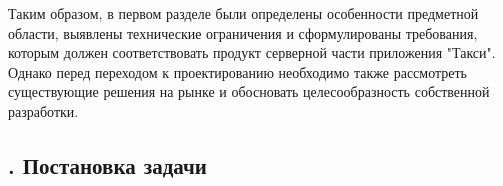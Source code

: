 {		\par \redline Таким образом, в первом разделе были определены особенности предметной области, выявлены технические ограничения и сформулированы требования, которым должен соответствовать продукт серверной части приложения "Такси"{}. Однако перед переходом к проектированию необходимо также рассмотреть существующие решения на рынке и обосновать целесообразность собственной разработки.
		
		\par
	}
	
	\subtitlespace
	
	\subsection*{
		\gostTitleFont
		\redline
		\thechaptercntr .\thesubchaptercntr \spc
		Постановка задачи
	} \addtocounter{subchaptercntr}{1}
	
	\subtitlespace
	
